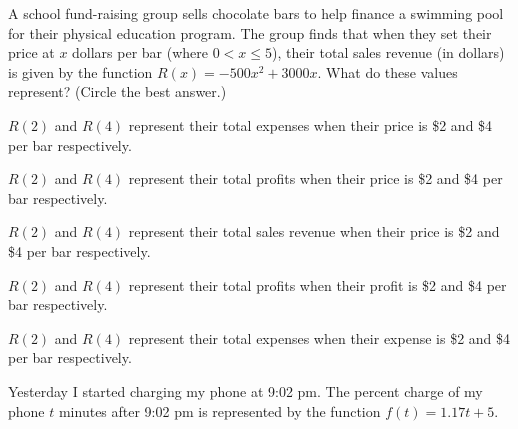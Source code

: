 \documentclass[11pt,answers]{exam}
\begin{document}
\begin{questions}


\addpoints

\bonusquestion[1]  A school fund-raising group sells chocolate bars to help finance a swimming pool for their physical education program. 
The group finds that when they set their price at $x$ dollars per bar (where 
$0 < x \leq 5$), their total sales revenue (in dollars) is given by the function 
$\displaystyle R(x) = −500x^2 + 3000x$. What do these values represent? (Circle the best answer.)

\begin{choices}
	\choice $R(2)$ and $R(4)$ represent their total expenses when their price is \$2 and \$4 per bar respectively.
	
	\choice $R(2)$ and $R(4)$ represent their total profits when their price is \$2 and \$4 per bar respectively.
	

	\choice $R(2)$ and $R(4)$ represent their total sales revenue when their price is \$2 and \$4 per bar respectively.
	
	\choice $R(2)$ and $R(4)$ represent their total profits when their profit is \$2 and \$4 per bar respectively.
	
	\choice $R(2)$ and $R(4)$ represent their total expenses when their expense is \$2 and \$4 per bar respectively.
\end{choices}





\question Yesterday I started charging my phone at 9:02 pm. The percent charge of my phone $t$ minutes after 9:02 pm is represented by the function $\displaystyle f(t)=1.17t+5$.



\end{questions}
\end{document}
